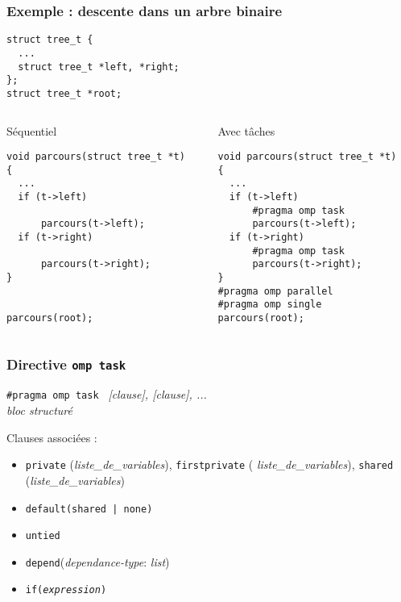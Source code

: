 \documentclass{beamer}
\begin{document}
\begin{frame}[fragile]
  \frametitle{Exemple : descente dans un arbre binaire}

\begin{verbatim}
struct tree_t {
  ...
  struct tree_t *left, *right;
};
struct tree_t *root;
\end{verbatim}

\begin{columns}[T]
  \begin{column}{0.49\textwidth}
    \begin{block}{Séquentiel}
\begin{verbatim}
void parcours(struct tree_t *t)
{
  ...
  if (t->left) 

      parcours(t->left);
  if (t->right) 

      parcours(t->right);
}


parcours(root);
\end{verbatim}
    \end{block}
  \end{column}

  \begin{column}{0.49\textwidth}
    \begin{block}{Avec tâches\phantom{Sq}}
\begin{verbatim}
void parcours(struct tree_t *t)
{
  ...
  if (t->left) 
      #pragma omp task
      parcours(t->left);
  if (t->right) 
      #pragma omp task
      parcours(t->right);
}
#pragma omp parallel
#pragma omp single
parcours(root);
\end{verbatim}
    \end{block}
  \end{column}
\end{columns}
\end{frame}


\begin{frame}
  \frametitle{Directive \texttt{omp task}}

  \begin{framed}
  {\tt \#pragma omp task } {\it [clause], [clause], ...}  \\
  {\it bloc structuré} 
\end{framed}

\medskip

Clauses associées :
  \begin{itemize}
  \item  {\tt private} ({\it liste\_de\_variables}), {\tt firstprivate} ({\it
      liste\_de\_variables}), {\tt shared} ({\it liste\_de\_variables})
  \item {\tt default(shared | none)}
  \item {\tt untied}
  \item {\tt depend}({\it dependance-type}: {\it list})
  \item {\tt if({\it expression})}
  \end{itemize}  
\end{frame}
\end{document}
